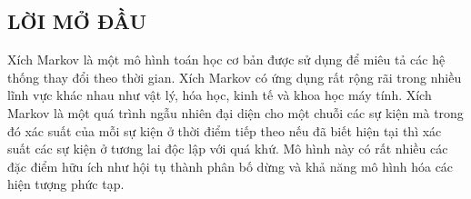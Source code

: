 \documentclass[14pt, a4paper]{article}
\numberwithin{equation}{section}
\numberwithin{figure}{section}
\theoremstyle{sltheorem}
\theoremstyle{soltheorem}
\numberwithin{dl}{section}
\numberwithin{md}{section}
\numberwithin{vd}{section}
\begin{document}
\begin{titlepage}





        \vfill %

    \end{titlepage}

    \cleardoublepage
    \tableofcontents
    \newpage
    \listoffigures
    \newpage
    \glsaddall 
    \renewcommand*{\glossaryname}{Danh mục các từ viết tắt}
    \renewcommand*{\acronymname}{Danh sách từ viết tắt}
    \renewcommand*{\entryname}{Viết tắt}
    \renewcommand*{\descriptionname}{Viết đầy đủ}
    \printnoidxglossary
    \cleardoublepage


    \newpage

    \nocite{*}

    \begin{center}
    \section*{LỜI MỞ ĐẦU}
    \end{center}

    Xích Markov là một mô hình toán học cơ bản được sử dụng để miêu tả các hệ thống thay đổi theo thời gian.
    Xích Markov có ứng dụng rất rộng rãi trong nhiều lĩnh vực khác nhau như vật lý, hóa học, kinh tế và khoa học máy tính.
    Xích Markov là một quá trình ngẫu nhiên đại diện cho một chuỗi các sự kiện mà trong đó xác suất của mỗi sự kiện ở thời điểm tiếp theo nếu đã biết hiện tại thì xác suất các sự kiện ở tương lai độc lập với quá khứ.
    Mô hình này có rất nhiều các đặc điểm hữu ích như hội tụ thành phân bố dừng và khả năng mô hình hóa các hiện tượng phức tạp.
\end{document}
